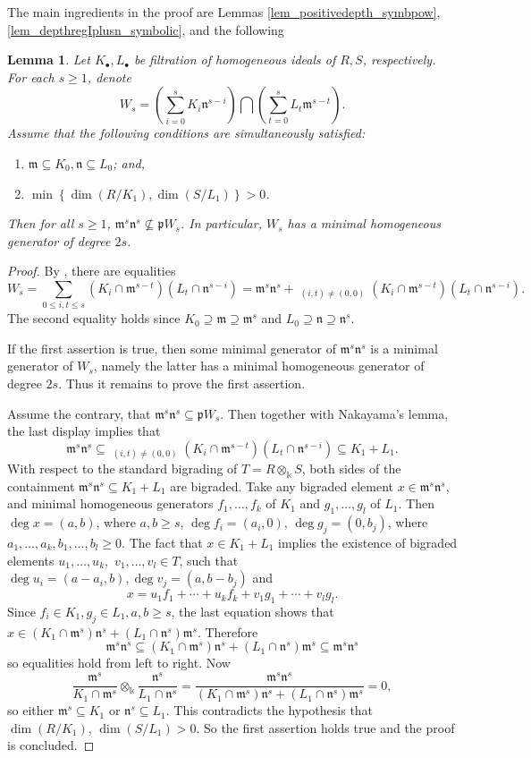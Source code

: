 \documentclass{amsart}
\newcommand{\mm}{\mathfrak{m}}
\newcommand{\nn}{\mathfrak{n}}
\newcommand{\pp}{\mathfrak{p}}
\theoremstyle{plain}
\newtheorem{lem}[thm]{Lemma}
\theoremstyle{definition}
\numberwithin{equation}{section}
\newcommand{\kk}{\Bbbk}
\begin{document}
The main ingredients in the proof are Lemmas \ref{lem_positivedepth_symbpow}, \ref{lem_depthregIplusn_symbolic}, and the following 
\begin{lem}
\label{lem_mingen_deg2s}
Let $K_\bullet, L_\bullet$ be filtration of homogeneous ideals of $R,S$, respectively. For each $s\ge 1$, denote
\[
W_s=\left(\sum_{i=0}^s K_i\nn^{s-i}\right) \bigcap \left(\sum_{t=0}^s L_t\mm^{s-t}\right).
\]
Assume that the following conditions are simultaneously satisfied: 
\begin{enumerate}[\quad \rm (1)]
 \item $\mm \subseteq K_0, \nn\subseteq L_0$; and,
 \item $\min\left\{\dim(R/K_1),\dim(S/L_1)\right\}>0$.
\end{enumerate}
Then for all $s\ge 1$, $\mm^s\nn^s\not\subseteq \pp W_s$. In particular, $W_s$ has a minimal homogeneous generator of degree $2s$.
\end{lem}
\begin{proof}
By , there are equalities
\[
W_s=\sum_{0\le i,t\le s}(K_i\cap \mm^{s-t})(L_t \cap \nn^{s-i})=\mm^s\nn^s+\mathop{\sum_{0\le i,t\le s}}_{(i,t)\neq (0,0)} (K_i\cap \mm^{s-t})(L_t\cap \nn^{s-i}).
\]
The second equality holds since $K_0\supseteq \mm \supseteq \mm^s$ and $L_0\supseteq \nn \supseteq \nn^s$.

If the first assertion is true, then some minimal generator of $\mm^s\nn^s$ is a minimal generator of $W_s$, namely the latter has a minimal homogeneous generator of degree $2s$. Thus it remains to prove the first assertion.

Assume the contrary, that $\mm^s\nn^s\subseteq \pp W_s$. Then together with Nakayama's lemma, the last display implies that
\[
\mm^s\nn^s\subseteq \mathop{\sum_{0\le i,t\le s}}_{(i,t)\neq (0,0)} (K_i\cap \mm^{s-t})(L_t \cap \nn^{s-i}) \subseteq K_1+L_1.
\]
With respect to the standard bigrading of $T=R\otimes_\kk S$, both sides of the containment $\mm^s\nn^s\subseteq K_1+L_1$ are bigraded. Take any bigraded element $x\in \mm^s\nn^s$, and minimal homogeneous generators $f_1,\ldots,f_k$ of $K_1$ and $g_1,\ldots,g_l$ of $L_1$. Then $\deg x=(a,b)$, where $a,b\ge s$, $\deg f_i=(a_i,0)$, $\deg g_j=(0,b_j)$, where $a_1,\ldots,a_k,b_1,\ldots,b_l\ge 0$. The fact that $x\in K_1+L_1$ implies the existence of bigraded elements $u_1,\ldots,u_k,$  $v_1,\ldots,v_l\in T$,  such that $\deg u_i=(a-a_i,b), \deg v_j=(a,b-b_j)$ and
\[
x=u_1f_1+\cdots+u_kf_k+v_1g_1+\cdots+v_lg_l.
\]
Since $f_i\in K_1, g_j\in L_1, a,b\ge s$, the last equation shows that $x\in (K_1\cap \mm^s)\nn^s+(L_1\cap \nn^s)\mm^s$. Therefore
\[
\mm^s\nn^s \subseteq (K_1\cap \mm^s)\nn^s+(L_1\cap \nn^s)\mm^s \subseteq \mm^s\nn^s
\]
so equalities hold from left to right. Now
\[
\frac{\mm^s}{K_1\cap \mm^s}\otimes_\kk \frac{\nn^s}{L_1\cap \nn^s}= \frac{\mm^s\nn^s}{(K_1\cap \mm^s)\nn^s+(L_1\cap \nn^s)\mm^s}=0,
\]
so either $\mm^s\subseteq K_1$ or $\nn^s\subseteq L_1$. This contradicts the hypothesis that $\dim(R/K_1)$, $\dim(S/L_1)>0$. So the first assertion holds true and the proof is concluded.
\end{proof}
\end{document}
